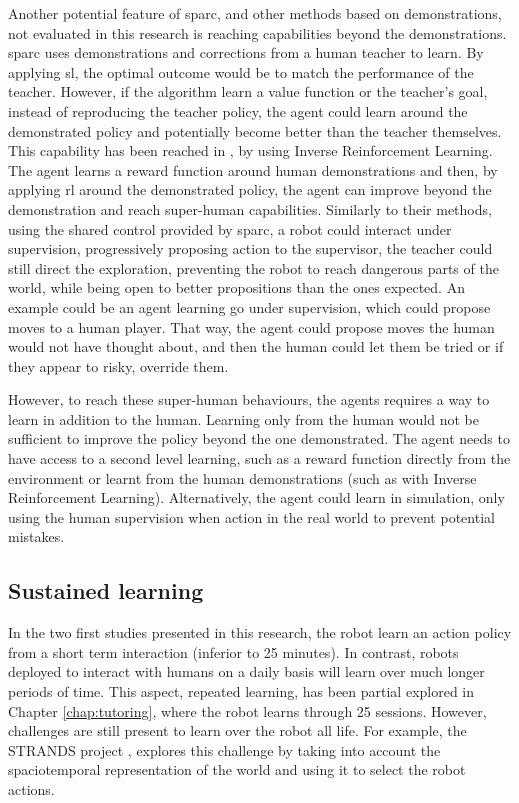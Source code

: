 Another potential feature of \gls{sparc}, and other methods based on demonstrations, not evaluated in this research is reaching capabilities beyond the demonstrations. \gls{sparc} uses demonstrations and corrections from a human teacher to learn. By applying \gls{sl}, the optimal outcome would be to match the performance of the teacher. However, if the algorithm learn a value function or the teacher's goal, instead of reproducing the teacher policy, the agent could learn around the demonstrated policy and potentially become better than the teacher themselves. This capability has been reached in \cite{abbeel2004apprenticeship}, by using Inverse Reinforcement Learning. The agent learns a reward function around human demonstrations and then, by applying \gls{rl} around the demonstrated policy, the agent can improve beyond the demonstration and reach super-human capabilities. Similarly to their methods, using the shared control provided by \gls{sparc}, a robot could interact under supervision, progressively proposing action to the supervisor, the teacher could still direct the exploration, preventing the robot to reach dangerous parts of the world, while being open to better propositions than the ones expected. An example could be an agent learning go under supervision, which could propose moves to a human player. That way, the agent could propose moves the human would not have thought about, and then the human could let them be tried or if they appear to risky, override them. 

However, to reach these super-human behaviours, the agents requires a way to learn in addition to the human. Learning only from the human would not be sufficient to improve the policy beyond the one demonstrated. The agent needs to have access to a second level learning, such as a reward function directly from the environment or learnt from the human demonstrations (such as with Inverse Reinforcement Learning). Alternatively, the agent could learn in simulation, only using the human supervision when action in the real world to prevent potential mistakes.

\subsection{Sustained learning}

In the two first studies presented in this research, the robot learn an action policy from a short term interaction (inferior to 25 minutes). In contrast, robots deployed to interact with humans on a daily basis will learn over much longer periods of time. This aspect, repeated learning, has been partial explored in Chapter \ref{chap:tutoring}, where the robot learns through 25 sessions. However, challenges are still present to learn over the robot all life. For example, the STRANDS project \cite{hawes2017strands}, explores this challenge by taking into account the spaciotemporal representation of the world and using it to select the robot actions.

